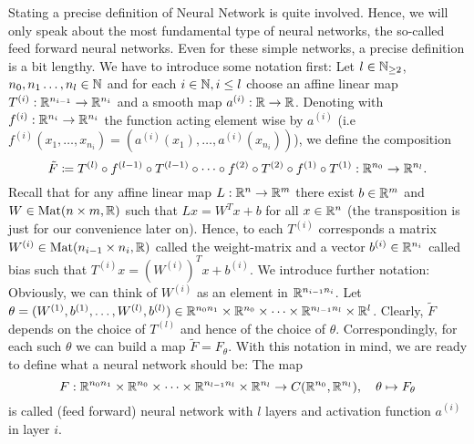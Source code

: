 Stating a precise definition of \grqq{}Neural Network\glqq{} is quite involved. 
Hence, we will only speak about the most fundamental type of neural networks, the so-called feed forward neural networks. 
Even for these simple networks, a precise definition is a bit lengthy. We have to introduce some notation first:
Let $l\in\mathbb{N}_{\geq2}$, $n_0,n_1\dots,n_l\in\mathbb{N}$ and for each $i\in\mathbb{N}, i\leq l$ 
choose an affine linear map $T^{(i)}:\mathbb{R}^{n_{i-1}}\to\mathbb{R}^{n_i}$ and a smooth map $a^{(i)}:\mathbb{R}\to\mathbb{R}$.
Denoting with $f^{(i)}:\mathbb{R}^{n_i}\to\mathbb{R}^{n_i}$ the function acting element wise by $a^{(i)}$ (i.e $f^{(i)}(x_1, \dots, x_{n_i})=(a^{(i)}(x_1),\dots, a^{(i)}(x_{n_i}))$), 
we define the composition 
\begin{equation*} 
\tilde{F}\coloneq T^{(l)}\circ f^{(l-1)}\circ T^{(l-1)}\circ\dots\circ f^{(2)}\circ T^{(2)}\circ f^{(1)}\circ T^{(1)}:\mathbb{R}^{n_0}\to\mathbb{R}^{n_l}.
\end{equation*}
Recall that for any affine linear map $L:\mathbb{R}^n\to\mathbb{R}^m$ there exist $b\in\mathbb{R}^m$ and $W\in \text{Mat}(n\times m,\mathbb{R})$ such that 
$Lx=W^Tx+b$ for all $x\in\mathbb{R}^n$ (the transposition is just for our convenience later on). Hence, to each $T^{(i)}$ corresponds a matrix $W^{(i)}\in\text{Mat}(n_{i-1}\times n_i,\mathbb{R})$ called the weight-matrix and a vector
$b^{(i)}\in\mathbb{R}^{n_i}$ called bias such that $T^{(i)}x=\left(W^{(i)}\right)^Tx + b^{(i)}$.
We introduce further notation: Obviously, we can think of $W^{(i)}$ as an element in $\mathbb{R}^{n_{i-1}n_i}$. 
Let $\theta=(W^{(1)},b^{(1)},\dots,W^{(l)},b^{(l)})\in\mathbb{R}^{n_0n_1}\times\mathbb{R}^{n_0}\times\dots\times\mathbb{R}^{n_{l-1}n_l}\times\mathbb{R}^{l}$. Clearly, $\tilde{F}$ depends on the choice of $T^{(l)}$ and hence of the choice of $\theta$. 
Correspondingly, for each such $\theta$ we can build a map $\tilde{F}=F_\theta$.
With this notation in mind, we are ready to define what a neural network should be: The map
\begin{equation*}
    F:\mathbb{R}^{n_0n_1}\times\mathbb{R}^{n_0}\times\dots\times\mathbb{R}^{n_{l-1}n_l}\times\mathbb{R}^{n_l}\to C(\mathbb{R}^{n_0},\mathbb{R}^{n_l}), \quad\theta\mapsto F_\theta
\end{equation*}
is called (feed forward) neural network with $l$ layers and activation function $a^{(i)}$ in layer $i$.

